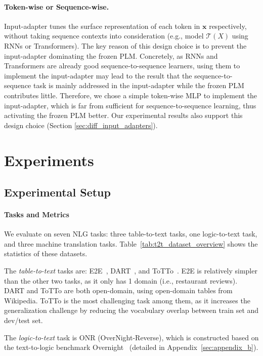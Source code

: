 \paragraph{Token-wise or Sequence-wise.} Input-adapter tunes the surface representation of each token in $\mathbf{x}$ respectively, without taking sequence contexts into consideration (e.g., model $\mathcal{T}(\mathit{X})$ using RNNs or Transformers). The key reason of this design choice is to prevent the input-adapter dominating the frozen PLM. Concretely, as RNNs and Transformers are already good sequence-to-sequence learners, using them to implement the input-adapter may lead to the result that the sequence-to-sequence task is mainly addressed in the input-adapter while the frozen PLM contributes little. Therefore, we chose a simple token-wise MLP to implement the input-adapter, which is far from sufficient for sequence-to-sequence learning, thus activating the frozen PLM better. Our experimental results also support this design choice (Section \ref{sec:diff_input_adapters}).

\section{Experiments}
\label{section:experiments}

\subsection{Experimental Setup}\label{sec:exp_setup}

\paragraph{Tasks and Metrics} \label{sec:tasks}
We evaluate on seven NLG tasks: three table-to-text tasks, one logic-to-text task, and three machine translation tasks.
Table~\ref{tab:t2t_dataset_overview} shows the statistics of these datasets.

The \emph{table-to-text} tasks are: E2E~\cite{novikova2017e2e},  DART~\cite{nan2020dart}, and ToTTo~\cite{parikh2020ToTTo}. E2E is relatively simpler than the other two tasks, as it only has 1 domain (i.e., restaurant reviews). DART and ToTTo are both open-domain, using open-domain tables from Wikipedia. ToTTo is the most challenging task among them, as it increases the generalization challenge by reducing the vocabulary overlap between train set and dev/test set.

The \emph{logic-to-text} task is ONR (OverNight-Reverse), which is constructed based on the text-to-logic benchmark Overnight~\cite{wang2015building} (detailed in Appendix~\ref{sec:appendix_b}).

